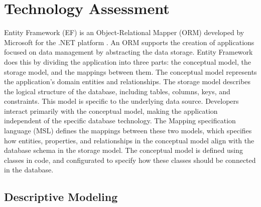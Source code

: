 \section{Technology Assessment}
\label{sec:technology}


Entity Framework (EF) is an Object-Relational Mapper (ORM) developed by Microsoft for the .NET platform \cite{EFoverview}. An ORM supports the creation of applications focused on data management by abstracting the data storage. Entity Framework does this by dividing the application into three parts: the conceptual model, the storage model, and the mappings between them. The conceptual model represents the application's domain entities and relationships. The storage model describes the logical structure of the database, including tables, columns, keys, and constraints. This model is specific to the underlying data source. Developers interact primarily with the conceptual model, making the application independent of the specific database technology. The Mapping specification language (MSL) defines the mappings between these two models, which specifies how entities, properties, and relationships in the conceptual model align with the database schema in the storage model. The conceptual model is defined using classes in code, and configurated to specify how these classes should be connected in the database. 


\subsection{Descriptive Modeling}

